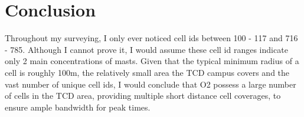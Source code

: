 \documentclass[a4paper,12pt]{article}
\begin{document}
\section{Conclusion}

Throughout my surveying, I only ever noticed cell ids between 100 - 117
and 716 - 785. Although I cannot prove it, I would assume these cell id
ranges indicate only 2 main concentrations of masts. Given that the
typical minimum radius of a cell is roughly 100m, the relatively small
area the TCD campus covers and the vast number of unique cell ids, I 
would conclude that O2 possess a large number of cells in the TCD 
area, providing multiple short distance cell coverages,
to ensure ample bandwidth for peak times.
\end{document}
